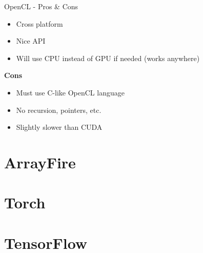 \documentclass{lug}
\begin{document}
\begin{frame}{OpenCL - Pros \& Cons}
\begin{itemize}
        \item Cross platform
        \item Nice API
        \item Will use CPU instead of GPU if needed (works anywhere)
    \end{itemize}

    \textbf{Cons}

    \begin{itemize}
        \item Must use C-like OpenCL language
        \item No recursion, pointers, etc.
        \item Slightly slower than CUDA
    \end{itemize}
\end{frame}

\section{ArrayFire}

\section{Torch}

\section{TensorFlow}
\end{document}
